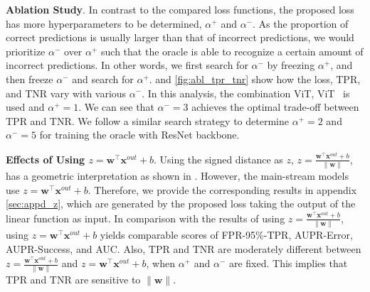 \noindent\textbf{Ablation Study}.
In contrast to the compared loss functions, the proposed loss has more hyperparameters to be determined, \ie $\alpha^{+}$ and $\alpha^{-}$.
As the proportion of correct predictions is usually larger than that of incorrect predictions, we would prioritize $\alpha^{-}$ over $\alpha^{+}$ such that the oracle is able to recognize a certain amount of incorrect predictions.
In other words, we first search for $\alpha^{-}$ by freezing $\alpha^{+}$, and then freeze $\alpha^{-}$ and search for $\alpha^{+}$.
 and \ref{fig:abl_tpr_tnr} show how the loss, TPR, and TNR vary with various $\alpha^{-}$. In this analysis, the combination \textlangle ViT, ViT\textrangle~ is used and $\alpha^{+}=1$.
We can see that $\alpha^{-}=3$ achieves the optimal trade-off between TPR and TNR.
We follow a similar search strategy to determine $\alpha^{+}=2$ and $\alpha^{-}=5$ for training the oracle with ResNet backbone.

\noindent\textbf{Effects of Using $z=\bm{w}^{\top}\bm{x}^{out}+b$}.
Using the signed distance as $z$, \ie $z = \frac{\bm{w}^{\top} \bm{x}^{out}+b}{\|\bm{w}\|}$, has a geometric interpretation as shown in .
However, the main-stream models \cite{He_CVPR_2016,Tan_ICML_2019,Dosovitskiy_ICLR_2021} use $z=\bm{w}^{\top}\bm{x}^{out}+b$. 
Therefore, we provide the corresponding results in appendix \ref{sec:appd_z}, which are generated by the proposed loss taking the output of the linear function as input.
In comparison with the results of using $z = \frac{\bm{w}^{\top} \bm{x}^{out}+b}{\|\bm{w}\|}$, using $z=\bm{w}^{\top}\bm{x}^{out}+b$ yields comparable scores of FPR-95\%-TPR, AUPR-Error, AUPR-Success, and AUC.
Also, TPR and TNR are moderately different between $z = \frac{\bm{w}^{\top} \bm{x}^{out}+b}{\|\bm{w}\|}$ and $z=\bm{w}^{\top}\bm{x}^{out}+b$, when $\alpha^{+}$ and $\alpha^{-}$ are fixed.
This implies that TPR and TNR are sensitive to $\|\bm{w}\|$. 
% 

